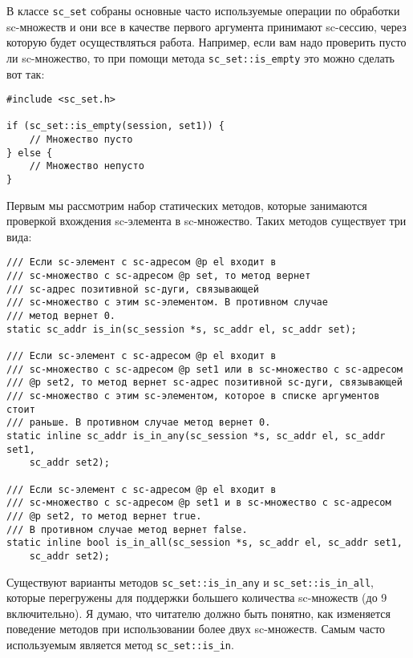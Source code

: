 В классе \lstinline|sc_set| собраны основные часто используемые операции по
обработки sc-множеств и они все в качестве первого аргумента принимают
sc-сессию, через которую будет осуществляться работа. Например, если
вам надо проверить пусто ли sc-множество, то при помощи метода
\lstinline|sc_set::is_empty| это можно сделать вот так:

\begin{lstlisting}[texcl]
#include <sc_set.h>

if (sc_set::is_empty(session, set1)) {
    // Множество пусто
} else {
    // Множество непусто
}
\end{lstlisting}

Первым мы рассмотрим набор статических методов, которые занимаются
проверкой вхождения sc-элемента в sc-множество. Таких методов
существует три вида:
\begin{lstlisting}[texcl]
/// Если sc-элемент c sc-адресом @p el входит в
/// sc-множество с sc-адресом @p set, то метод вернет
/// sc-адрес позитивной sc-дуги, связывающей
/// sc-множество с этим sc-элементом. В противном случае
/// метод вернет 0.
static sc_addr is_in(sc_session *s, sc_addr el, sc_addr set);

/// Если sc-элемент c sc-адресом @p el входит в
/// sc-множество с sc-адресом @p set1 или в sc-множество с sc-адресом
/// @p set2, то метод вернет sc-адрес позитивной sc-дуги, связывающей
/// sc-множество с этим sc-элементом, которое в списке аргументов стоит
/// раньше. В противном случае метод вернет 0.
static inline sc_addr is_in_any(sc_session *s, sc_addr el, sc_addr set1,
    sc_addr set2);

/// Если sc-элемент c sc-адресом @p el входит в
/// sc-множество с sc-адресом @p set1 и в sc-множество с sc-адресом
/// @p set2, то метод вернет true.
/// В противном случае метод вернет false.
static inline bool is_in_all(sc_session *s, sc_addr el, sc_addr set1,
    sc_addr set2);
\end{lstlisting}

Существуют варианты методов \lstinline|sc_set::is_in_any| и
\lstinline|sc_set::is_in_all|, которые перегружены для поддержки
большего количества sc-множеств (до 9 включительно). Я думаю, что
читателю должно быть понятно, как изменяется поведение методов при
использовании более двух sc-множеств. Самым часто используемым
является метод \lstinline|sc_set::is_in|.

